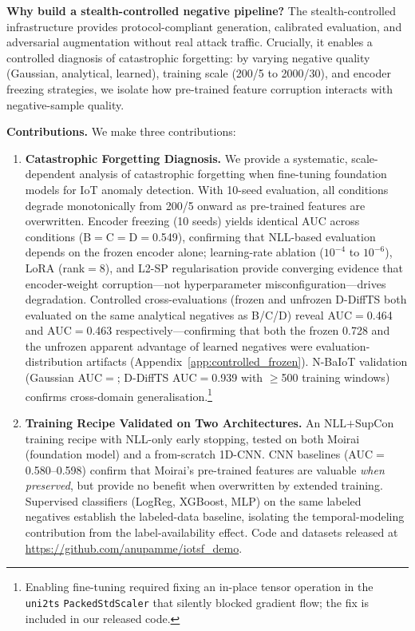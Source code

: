 \textbf{Why build a stealth-controlled negative pipeline?}
The stealth-controlled infrastructure provides protocol-compliant generation,
calibrated evaluation, and adversarial augmentation without real
attack traffic.
Crucially, it enables a controlled diagnosis of catastrophic forgetting:
by varying negative quality (Gaussian, analytical, learned), training scale
(200/5 to 2000/30), and encoder freezing strategies, we isolate how
pre-trained feature corruption interacts with negative-sample quality.

\textbf{Contributions.}  We make three contributions:
\begin{enumerate}
  \item \textbf{Catastrophic Forgetting Diagnosis.}
    We provide a systematic, scale-dependent analysis of catastrophic
    forgetting when fine-tuning foundation models for IoT anomaly detection.
    With 10-seed evaluation, all conditions degrade monotonically from
    200/5 onward as pre-trained features are overwritten.
    Encoder freezing (10 seeds) yields identical AUC across conditions
    (B$=$C$=$D$=$0.549), confirming that NLL-based evaluation depends
    on the frozen encoder alone; learning-rate ablation ($10^{-4}$ to
    $10^{-6}$), LoRA (rank$=$8), and L2-SP regularisation provide
    converging evidence that encoder-weight corruption---not
    hyperparameter misconfiguration---drives degradation.
    Controlled cross-evaluations (frozen and unfrozen D-DiffTS both evaluated
    on the same analytical negatives as B/C/D) reveal AUC$=$0.464 and
    AUC$=$0.463 respectively---confirming that both the frozen 0.728 and the
    unfrozen apparent advantage of learned negatives were evaluation-distribution
    artifacts (Appendix~\ref{app:controlled_frozen}).
    N-BaIoT validation (Gaussian AUC$=$\nbaiotAUC{};
    D-DiffTS AUC$=$0.939 with $\geq$500 training windows) confirms
    cross-domain generalisation.\footnote{%
      Enabling fine-tuning required fixing an in-place tensor operation in
      the \texttt{uni2ts} \texttt{PackedStdScaler} that silently blocked
      gradient flow; the fix is included in our released code.}

  \item \textbf{Training Recipe Validated on Two Architectures.}
    An NLL$+$SupCon training recipe with NLL-only early stopping,
    tested on both Moirai (foundation model) and a from-scratch 1D-CNN.
    CNN baselines (AUC$=$0.580--0.598) confirm that Moirai's pre-trained
    features are valuable \emph{when preserved}, but provide no benefit
    when overwritten by extended training.
    Supervised classifiers (LogReg, XGBoost, MLP) on the same labeled negatives
    establish the labeled-data baseline, isolating the temporal-modeling
    contribution from the label-availability effect.
    Code and datasets released at \url{https://github.com/anupamme/iotsf_demo}.


\end{enumerate}
